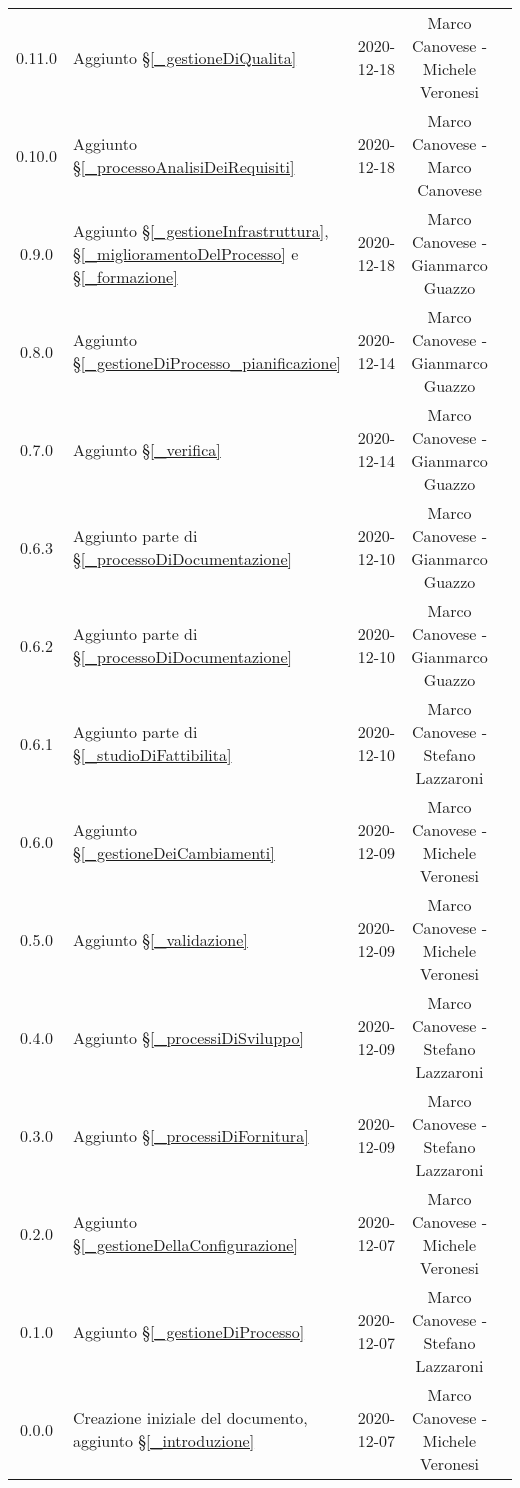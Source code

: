 \begin{center}
\begin{longtable}{|c|p{5cm}|c|c|c|}
		0.11.0 & Aggiunto \S\ref{_gestioneDiQualita} & 2020-12-18 & Marco Canovese - Michele Veronesi \\
		0.10.0 & Aggiunto \S\ref{_processoAnalisiDeiRequisiti} & 2020-12-18 & Marco Canovese - Marco Canovese  \\
		0.9.0 & Aggiunto \S\ref{_gestioneInfrastruttura}, \S\ref{_miglioramentoDelProcesso} e \S\ref{_formazione} & 2020-12-18 & Marco Canovese - Gianmarco Guazzo  \\
		0.8.0 & Aggiunto \S\ref{_gestioneDiProcesso_pianificazione} & 2020-12-14 & Marco Canovese - Gianmarco Guazzo \\
		0.7.0 & Aggiunto \S\ref{_verifica} & 2020-12-14& Marco Canovese - Gianmarco Guazzo \\
		0.6.3 & Aggiunto parte di \S\ref{_processoDiDocumentazione} & 2020-12-10 & Marco Canovese - Gianmarco Guazzo \\
		0.6.2 & Aggiunto parte di \S\ref{_processoDiDocumentazione} & 2020-12-10 & Marco Canovese - Gianmarco Guazzo \\
		0.6.1 & Aggiunto parte di \S\ref{_studioDiFattibilita} & 2020-12-10 & Marco Canovese - Stefano Lazzaroni  \\
		0.6.0 & Aggiunto \S\ref{_gestioneDeiCambiamenti} & 2020-12-09 & Marco Canovese - Michele Veronesi \\
		0.5.0 & Aggiunto \S\ref{_validazione} & 2020-12-09 & Marco Canovese - Michele Veronesi  \\
		0.4.0 & Aggiunto \S\ref{_processiDiSviluppo} & 2020-12-09 & Marco Canovese - Stefano Lazzaroni  \\
		0.3.0 & Aggiunto \S\ref{_processiDiFornitura} & 2020-12-09 & Marco Canovese - Stefano Lazzaroni \\
		0.2.0 & Aggiunto \S\ref{_gestioneDellaConfigurazione} & 2020-12-07 & Marco Canovese - Michele Veronesi  \\
		0.1.0 & Aggiunto \S\ref{_gestioneDiProcesso} & 2020-12-07 & Marco Canovese - Stefano Lazzaroni \\
		0.0.0 & Creazione iniziale del documento, aggiunto \S\ref{_introduzione} & 2020-12-07 & Marco Canovese - Michele Veronesi \\
		
		\hline
	\end{longtable}
\end{center}